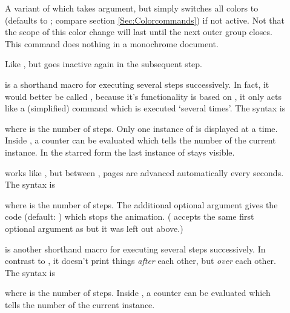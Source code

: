 \documentclass[12pt]{scrartcl}
\let\newslide=\relax
\begin{document}
\begin{description}
  \item[]
    A variant of  which takes  argument, but simply
    switches all colors to  (defaults to
    ; compare section \ref{Sec:Colorcommands}) if not
    active. Not that the scope of this color change will last until the next outer group closes. This command does
    nothing in a monochrome document.

  \item[]
    Like , but goes inactive again in the subsequent step.

  \item[]
   is a shorthand macro for executing several steps successively. In
   fact, it would better be called , because it's
   functionality is based on , it only acts like a
   (simplified)  command which is executed `several times'.
   The syntax is
   \begin{center}
   \end{center}
   where  is the number of steps. Only one instance of
    is displayed at a time. Inside , a
   counter  can be evaluated which tells the number of the
   current instance. In the starred form the last instance of
    stays visible.

  \item[]
    works like , but between , pages are
    advanced automatically every  seconds. The syntax is
   \begin{center}
   \end{center}
   where  is the number of steps. The additional optional argument
    gives the code (default: )
    which stops the animation.
   ( accepts the same first optional argument as
    but it was left out above.)


  \item[]
    is another shorthand macro for executing several steps successively. In
    contrast to , it doesn't print things \emph{after}
    each other, but \emph{over} each other. The syntax is
    \begin{center}
    \end{center}
    where  is the number of steps. Inside , a
    counter  can be evaluated which tells the number of the
    current instance.
    \newslide


\end{description}
\end{document}
